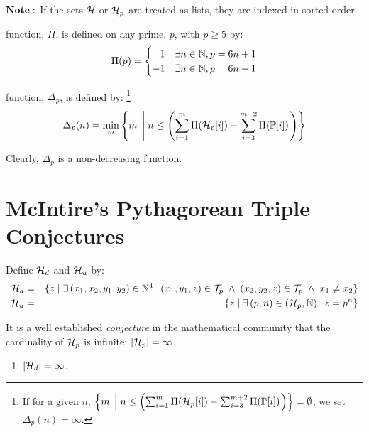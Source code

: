 \documentclass{article}
\theoremstyle{definition}
\begin{document}
${\bf Note:\/}$ If the sets ${\cal H}$ or ${\cal H}_p$ are treated as lists, they are indexed in sorted order.

 function, $\Pi$, is defined on any prime, $p$, with $p \ge 5$ by:
\begin{eqnarray}
  \Pi(p) = \begin{cases}
  \hphantom{-}1\hfil & \exists n \in \mathbb{N}, p = 6n + 1 \\
            -1 \hfil & \exists n \in \mathbb{N}, p = 6n - 1 \\
             \end{cases} 
\end{eqnarray}

 function, $\Delta_p$, is defined by:%
\footnote{If for a given $n$, 
$\left\{ m \; \left| \; n \le \left( \sum_{i=1}^m \Pi({\cal H}_p[i]) - \sum_{i=3}^{m+2} \Pi(\mathbb{P}[i]) \right. \right) \right\} = \emptyset$, we set $\Delta_p(n) = \infty$.}
\begin{eqnarray}
\Delta_p(n) = \mathop{\rm min}\limits_{m} \left\{ m \; \left| \; n \le \left( \sum_{i=1}^m \Pi({\cal H}_p[i]) - \sum_{i=3}^{m+2} \Pi(\mathbb{P}[i])\right. \right) \right\} 
\end{eqnarray}

Clearly, $\Delta_p$ is a non-decreasing function.


\section{McIntire's Pythagorean Triple Conjectures}

Define ${\cal H}_d$ and ${\cal H}_u$ by:
\begin{eqnarray}
  {\cal H}_{d} & = & \{ z \; | \; \exists\, (x_1, x_2, y_1, y_2) \in \mathbb{N}^4, \; 
      (x_1,y_1,z) \in {\cal T}_p \; \wedge \; (x_2, y_2, z) \in {\cal T}_p \; \wedge \; x_1 \neq x_2 \}  \\
    {\cal H}_u & = & \{ z \; | \; \exists\,(p,n) \in ({\cal H}_p, \mathbb{N}), \; z = p^n \}
\end{eqnarray}

It is a well established {\em conjecture\/} in the mathematical community that the cardinality of ${\cal H}_p$ is infinite: $|{\cal H}_p| = \infty$.
  \begin{enumerate}
    \item{$|{\cal H}_d| = \infty$.}
  \end{enumerate}
\end{document}
